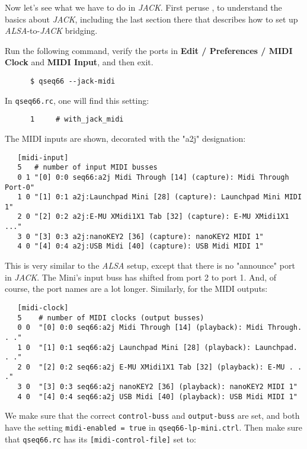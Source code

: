    Now let's see what we have to do in \textsl{JACK}.
   First peruse , to understand the basics about
   \textsl{JACK}, including the last section there that describes how to set up
   \textsl{ALSA}-to-\textsl{JACK} bridging.

   Run the following command, verify the ports in
   \textbf{Edit / Preferences / MIDI Clock} and \textbf{MIDI Input}, and then
   exit.

   \begin{verbatim}
      $ qseq66 --jack-midi
   \end{verbatim}

   In \texttt{qseq66.rc}, one will find this setting:

   \begin{verbatim}
      1     # with_jack_midi
   \end{verbatim}

   The MIDI inputs are shown, decorated with the "a2j" designation:

   \begin{verbatim}
   [midi-input]
   5   # number of input MIDI busses
   0 1 "[0] 0:0 seq66:a2j Midi Through [14] (capture): Midi Through Port-0"
   1 0 "[1] 0:1 a2j:Launchpad Mini [28] (capture): Launchpad Mini MIDI 1"
   2 0 "[2] 0:2 a2j:E-MU XMidi1X1 Tab [32] (capture): E-MU XMidi1X1 ..."
   3 0 "[3] 0:3 a2j:nanoKEY2 [36] (capture): nanoKEY2 MIDI 1"
   4 0 "[4] 0:4 a2j:USB Midi [40] (capture): USB Midi MIDI 1"
   \end{verbatim}

   This is very similar to the \textsl{ALSA} setup, except that there is no
   "announce" port in \textsl{JACK}.  The Mini's input buss has shifted from
   port 2 to port 1.  And, of course, the port names are a lot
   longer.  Similarly, for the MIDI outputs:

   \begin{verbatim}
   [midi-clock]
   5    # number of MIDI clocks (output busses)
   0 0  "[0] 0:0 seq66:a2j Midi Through [14] (playback): Midi Through. . ."
   1 0  "[1] 0:1 seq66:a2j Launchpad Mini [28] (playback): Launchpad. . ."
   2 0  "[2] 0:2 seq66:a2j E-MU XMidi1X1 Tab [32] (playback): E-MU . . ."
   3 0  "[3] 0:3 seq66:a2j nanoKEY2 [36] (playback): nanoKEY2 MIDI 1"
   4 0  "[4] 0:4 seq66:a2j USB Midi [40] (playback): USB Midi MIDI 1"
   \end{verbatim}

   We make sure that the correct \texttt{control-buss} and
   \texttt{output-buss} are set, and both have the setting
   \texttt{midi-enabled = true} in \texttt{qseq66-lp-mini.ctrl}.
   Then make sure that \texttt{qseq66.rc} has its
   \texttt{[midi-control-file]} set to:


